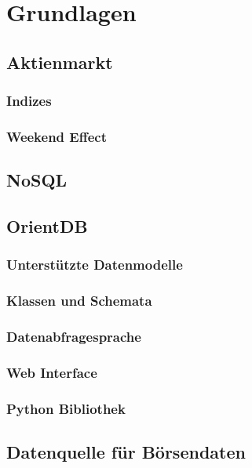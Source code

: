 \section{Grundlagen}

\subsection{Aktienmarkt}

\subsubsection{Indizes}

\subsubsection{Weekend Effect}

\subsection{NoSQL}

\subsection{OrientDB}

\subsubsection{Unterstützte Datenmodelle}

\subsubsection{Klassen und Schemata}

\subsubsection{Datenabfragesprache}

\subsubsection{Web Interface}

\subsubsection{Python Bibliothek}

\subsection{Datenquelle für Börsendaten}

\clearpage